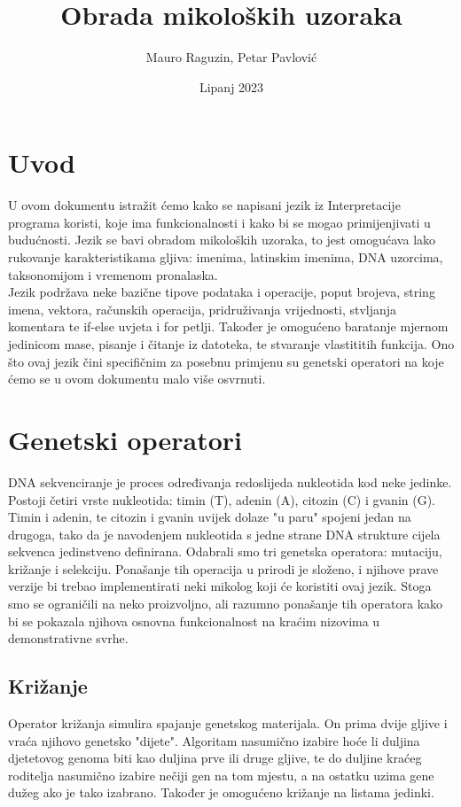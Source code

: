 \documentclass{article}
\title{Obrada mikoloških uzoraka}
\author{Mauro Raguzin, Petar Pavlović}
\date{Lipanj 2023}
\begin{document}
\maketitle

\section{Uvod}
U ovom dokumentu istražit ćemo kako se napisani jezik iz Interpretacije programa koristi, koje ima
funkcionalnosti i kako bi se mogao primijenjivati u budućnosti. Jezik se bavi obradom mikoloških uzoraka,
to jest omogućava lako rukovanje karakteristikama gljiva: imenima, latinskim imenima, DNA uzorcima,
taksonomijom i vremenom pronalaska.
\\Jezik podržava neke bazične tipove podataka i operacije, poput brojeva, string imena, vektora,
računskih operacija, pridruživanja vrijednosti, stvljanja komentara te if-else uvjeta i for petlji.
Također je omogućeno baratanje mjernom jedinicom mase, pisanje i čitanje iz datoteka, te stvaranje
vlastititih funkcija.
Ono što ovaj jezik čini specifičnim za posebnu primjenu su genetski operatori na koje ćemo se u ovom
dokumentu malo više osvrnuti. 

\section{Genetski operatori}
DNA sekvenciranje je proces određivanja redoslijeda nukleotida kod neke jedinke. Postoji četiri vrste
nukleotida: timin (T), adenin (A), citozin (C) i gvanin (G). Timin i adenin, te citozin i gvanin uvijek
dolaze "u paru" spojeni jedan na drugoga, tako da je navodenjem nukleotida s jedne strane DNA strukture
cijela sekvenca jedinstveno definirana. Odabrali smo tri genetska operatora: mutaciju, križanje i
selekciju. Ponašanje tih operacija u prirodi je složeno, i njihove prave verzije bi trebao implementirati
neki mikolog koji će koristiti ovaj jezik. Stoga smo se ograničili na neko proizvoljno, ali razumno
ponašanje tih operatora kako bi se pokazala njihova osnovna funkcionalnost na kraćim nizovima u
demonstrativne svrhe.
\subsection{Križanje}
Operator križanja simulira spajanje genetskog materijala. On prima dvije gljive i vraća njihovo genetsko
"dijete". Algoritam nasumično izabire hoće li duljina djetetovog genoma biti kao duljina prve ili druge
gljive, te do duljine kraćeg roditelja nasumično izabire nečiji gen na tom mjestu, a na ostatku uzima gene
dužeg ako je tako izabrano. Također je omogućeno križanje na listama jedinki.
\end{document}
